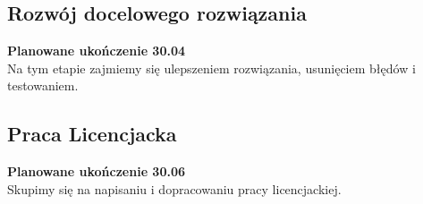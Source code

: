 \documentclass[12pt]{article}
\begin{document}
\subsection*{Rozwój docelowego rozwiązania}
\textbf{Planowane ukończenie 30.04}\\
Na tym etapie zajmiemy się ulepszeniem rozwiązania, usunięciem błędów i testowaniem. 
\subsection*{Praca Licencjacka}
\textbf{Planowane ukończenie 30.06}\\
Skupimy się na napisaniu i dopracowaniu pracy licencjackiej.




\end{document}
